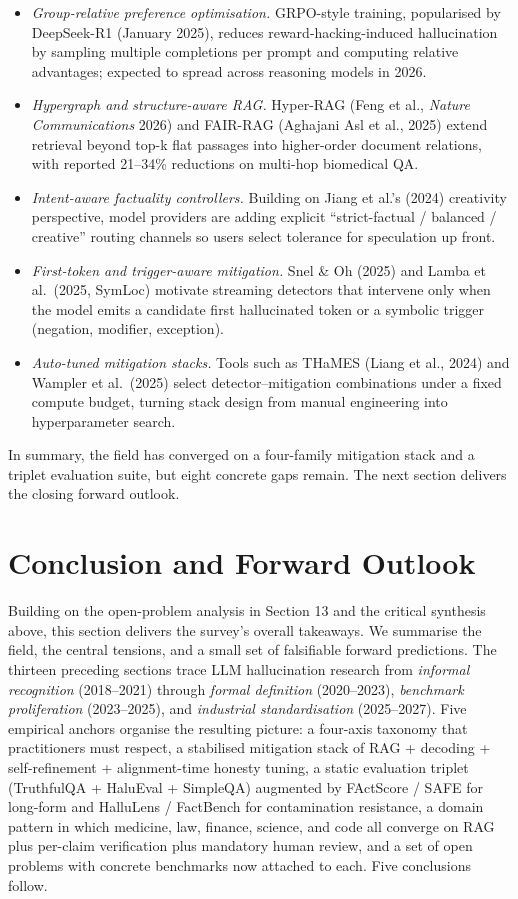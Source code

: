 \begin{itemize}
\tightlist
\item
  \emph{Group-relative preference optimisation.} GRPO-style training, popularised by DeepSeek-R1 (January 2025), reduces reward-hacking-induced hallucination by sampling multiple completions per prompt and computing relative advantages; expected to spread across reasoning models in 2026.
\item
  \emph{Hypergraph and structure-aware RAG.} Hyper-RAG (Feng et al., \emph{Nature Communications} 2026) and FAIR-RAG (Aghajani Asl et al., 2025) extend retrieval beyond top-k flat passages into higher-order document relations, with reported 21--34\% reductions on multi-hop biomedical QA.
\item
  \emph{Intent-aware factuality controllers.} Building on Jiang et al.'s (2024) creativity perspective, model providers are adding explicit ``strict-factual / balanced / creative'' routing channels so users select tolerance for speculation up front.
\item
  \emph{First-token and trigger-aware mitigation.} Snel \& Oh (2025) and Lamba et al.~(2025, SymLoc) motivate streaming detectors that intervene only when the model emits a candidate first hallucinated token or a symbolic trigger (negation, modifier, exception).
\item
  \emph{Auto-tuned mitigation stacks.} Tools such as THaMES (Liang et al., 2024) and Wampler et al.~(2025) select detector--mitigation combinations under a fixed compute budget, turning stack design from manual engineering into hyperparameter search.
\end{itemize}

In summary, the field has converged on a four-family mitigation stack and a triplet evaluation suite, but eight concrete gaps remain. The next section delivers the closing forward outlook.

\section{Conclusion and Forward Outlook}\label{conclusion-and-forward-outlook}

Building on the open-problem analysis in Section 13 and the critical synthesis above, this section delivers the survey's overall takeaways. We summarise the field, the central tensions, and a small set of falsifiable forward predictions. The thirteen preceding sections trace LLM hallucination research from \emph{informal recognition} (2018--2021) through \emph{formal definition} (2020--2023), \emph{benchmark proliferation} (2023--2025), and \emph{industrial standardisation} (2025--2027). Five empirical anchors organise the resulting picture: a four-axis taxonomy that practitioners must respect, a stabilised mitigation stack of RAG + decoding + self-refinement + alignment-time honesty tuning, a static evaluation triplet (TruthfulQA + HaluEval + SimpleQA) augmented by FActScore / SAFE for long-form and HalluLens / FactBench for contamination resistance, a domain pattern in which medicine, law, finance, science, and code all converge on RAG plus per-claim verification plus mandatory human review, and a set of open problems with concrete benchmarks now attached to each. Five conclusions follow.

